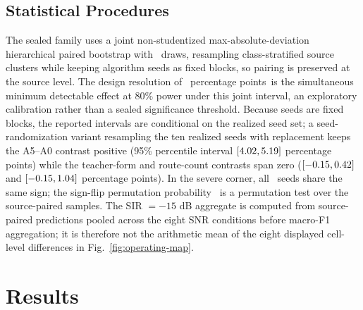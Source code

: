 \documentclass[letterpaper,journal]{IEEEtran}
\newcommand{\pp}{percentage points}
\begin{document}
\subsection{Statistical Procedures}
The sealed family uses a joint non-studentized max-absolute-deviation
hierarchical paired bootstrap with \ProtocolBootstrapDraws\ draws, resampling
class-stratified source clusters while keeping algorithm seeds as fixed
blocks, so pairing is preserved at the source level. The design resolution of
\DesignResolution\ \pp\ is the simultaneous minimum detectable effect at 80\%
power under this joint interval, an exploratory calibration rather than a
sealed significance threshold. Because seeds are fixed blocks, the reported
intervals are conditional on the realized seed set; a seed-randomization
variant resampling the ten realized seeds with replacement keeps the A5--A0
contrast positive (95\% percentile interval
$[4.02,5.19]$ \pp) while the teacher-form and
route-count contrasts span zero
($[-0.15,0.42]$ and
$[-0.15,1.04]$ \pp). In the severe corner, all
\SevereGainIqformerPositiveSeeds\ seeds share the same sign; the sign-flip
permutation probability \SevereGainIqformerSignFlipP\ is a permutation test
over the source-paired samples. The SIR $=-15$ dB aggregate is computed from
source-paired predictions pooled across the eight SNR conditions before
macro-F1 aggregation; it is therefore not the arithmetic mean of the eight
displayed cell-level differences in Fig.~\ref{fig:operating-map}.

\section{Results}
\end{document}
